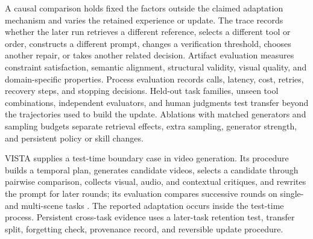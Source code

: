 A causal comparison holds fixed the factors outside the claimed adaptation mechanism and varies the retained experience or update. The trace records whether the later run retrieves a different reference, selects a different tool or order, constructs a different prompt, changes a verification threshold, chooses another repair, or takes another related decision. Artifact evaluation measures constraint satisfaction, semantic alignment, structural validity, visual quality, and domain-specific properties. Process evaluation records calls, latency, cost, retries, recovery steps, and stopping decisions. Held-out task families, unseen tool combinations, independent evaluators, and human judgments test transfer beyond the trajectories used to build the update. Ablations with matched generators and sampling budgets separate retrieval effects, extra sampling, generator strength, and persistent policy or skill changes.

VISTA supplies a test-time boundary case in video generation. Its procedure builds a temporal plan, generates candidate videos, selects a candidate through pairwise comparison, collects visual, audio, and contextual critiques, and rewrites the prompt for later rounds; its evaluation compares successive rounds on single- and multi-scene tasks \cite{long2026vista}. The reported adaptation occurs inside the test-time process. Persistent cross-task evidence uses a later-task retention test, transfer split, forgetting check, provenance record, and reversible update procedure.
